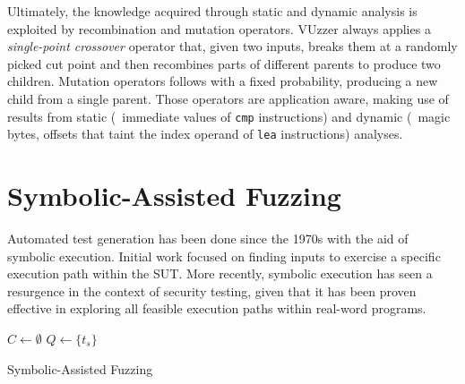 Ultimately, the knowledge acquired through static and dynamic analysis is
exploited by recombination and mutation operators. VUzzer always applies a
\emph{single-point crossover} operator that, given two inputs, breaks them at a
randomly picked cut point and then recombines parts of different parents to
produce two children. Mutation operators follows with a fixed probability,
producing a new child from a single parent. Those operators are application
aware, making use of results from static (\eg~immediate values of \texttt{cmp}
instructions) and dynamic (\eg~magic bytes, offsets that taint the index operand
of \texttt{lea} instructions) analyses.

\section{Symbolic-Assisted Fuzzing}
Automated test generation has been done since the 1970s with the aid of symbolic
execution. Initial work focused on finding inputs to exercise a specific
execution path within the \ac{SUT}. More recently, symbolic execution has seen a
resurgence in the context of security testing, given that it has been proven
effective in exploring all feasible execution paths within real-word programs.

\begin{algorithm}
    \DontPrintSemicolon%
    \BlankLine%
    $C \leftarrow \emptyset$\;
    $Q \leftarrow \{t_s\}$\;\label{algo:symfuzz:initq}
    \caption{Symbolic-Assisted Fuzzing}
\label{algo:symfuzz}
\end{algorithm}

